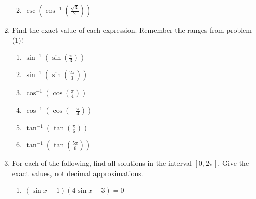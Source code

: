 \documentclass[12pt]{article}
\newif\ifans
\begin{document}
\begin{enumerate}
\begin{enumerate}
\ifans\fbox{$\displaystyle \frac{\sqrt{5}}{3}$}\fi

\item $\displaystyle \csc{\left(\cos^{-1}{\left(\frac{\sqrt{3}}{2}\right)}\right)}$

\ifans\fbox{$2$}\fi

\end{enumerate}

\item Find the exact value of each expression.  Remember the ranges from problem (1)!

\begin{enumerate}

\item $\displaystyle \sin^{-1}{\left(\sin{\left(\frac{\pi}{3}\right)}\right)}$

\ifans\fbox{$\displaystyle \frac{\pi}{3}$}\fi

\item $\displaystyle \sin^{-1}{\left(\sin{\left(\frac{2\pi}{3}\right)}\right)}$

\ifans\fbox{$\displaystyle \frac{\pi}{3}$}\fi

\item $\displaystyle \cos^{-1}{\left(\cos{\left(\frac{\pi}{4}\right)}\right)}$

\ifans\fbox{$\displaystyle \frac{\pi}{4}$}\fi

\item $\displaystyle \cos^{-1}{\left(\cos{\left(-\frac{\pi}{4}\right)}\right)}$

\ifans\fbox{$\displaystyle \frac{\pi}{4}$}\fi

\item $\displaystyle \tan^{-1}{\left(\tan{\left(\frac{\pi}{6}\right)}\right)}$

\ifans\fbox{$\displaystyle \frac{\pi}{6}$}\fi

\item $\displaystyle \tan^{-1}{\left(\tan{\left(\frac{5\pi}{6}\right)}\right)}$

\ifans\fbox{$\displaystyle -\frac{\pi}{6}$}\fi

\end{enumerate}

\item For each of the following, find all solutions in the interval $[0,2\pi]$.  Give the exact values, not decimal approximations.

\begin{enumerate}

\item $(\sin{x}-1)(4\sin{x}-3) = 0$


\end{enumerate}
\end{enumerate}
\end{document}

